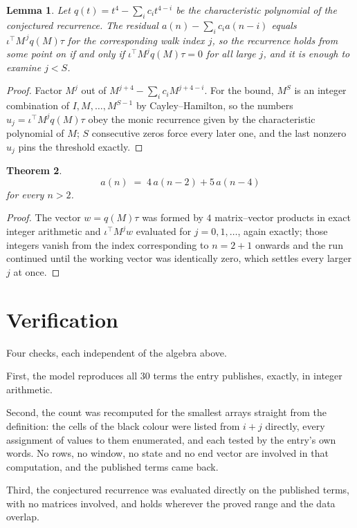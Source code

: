 \documentclass[11pt,a4paper]{article}
\theoremstyle{plain}
\newtheorem{theorem}{Theorem}
\newtheorem{lemma}[theorem]{Lemma}
\theoremstyle{definition}
\begin{document}
\begin{lemma}\label{lem:crit}
Let $q(t)=t^{4}-\sum_i c_it^{4-i}$ be the characteristic polynomial of the
conjectured recurrence. The residual $a(n)-\sum_ic_ia(n-i)$ equals
$\iota^{\!\top}M^{\,j}q(M)\tau$ for the corresponding walk index $j$, so the recurrence
holds from some point on if and only if $\iota^{\!\top}M^{j}q(M)\tau=0$ for all large $j$,
and it is enough to examine $j<S$.
\end{lemma}

\begin{proof}
Factor $M^{j}$ out of $M^{j+4}-\sum_ic_iM^{j+4-i}$. For the bound, $M^{S}$
is an integer combination of $I,M,\dots,M^{S-1}$ by Cayley--Hamilton, so the numbers
$u_j=\iota^{\!\top}M^{j}q(M)\tau$ obey the monic recurrence given by the characteristic
polynomial of $M$; $S$ consecutive zeros force every later one, and the last nonzero $u_j$
pins the threshold exactly.
\end{proof}

\begin{theorem}
\[
a(n)\;=\;4\,a(n-2) + 5\,a(n-4)
\]
for every $n>2$.
\end{theorem}

\begin{proof}
The vector $w=q(M)\tau$ was formed by $4$ matrix--vector products in exact integer
arithmetic and $\iota^{\!\top}M^{j}w$ evaluated for $j=0,1,\dots$, again exactly; those
integers vanish from the index corresponding to $n=2+1$ onwards and the run continued
until the working vector was identically zero, which settles every larger $j$ at once.
\end{proof}

\section{Verification}

Four checks, each independent of the algebra above.

First, the model reproduces all $30$ terms the entry publishes, exactly, in integer
arithmetic.

Second, the count was recomputed for the smallest arrays straight from the definition: the cells
of the black colour were listed from $i+j$ directly, every assignment of values to them
enumerated, and each tested by the entry's own words. No rows, no window, no state and no end
vector are involved in that computation, and the published terms came back.

Third, the conjectured recurrence was evaluated directly on the published terms, with no
matrices involved, and holds wherever the proved range and the data overlap.
\end{document}
